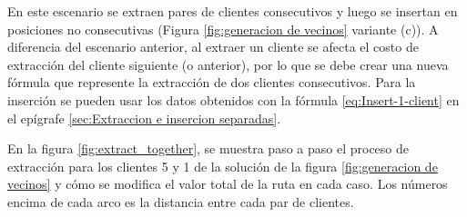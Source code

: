 \documentclass[12pt]{report}
\begin{document}
	En este escenario se extraen pares de clientes consecutivos y luego se insertan en posiciones no consecutivas (Figura \ref{fig:generacion de vecinos} variante (c)). A diferencia del escenario anterior, al extraer un cliente se afecta el costo de extracción del cliente siguiente (o anterior), por lo que se debe crear una nueva fórmula que represente la extracción de dos clientes consecutivos. Para la inserción se pueden usar los datos obtenidos con la fórmula \ref{eq:Insert-1-client} en el epígrafe \ref{sec:Extraccion e insercion separadas}.

	En la figura \ref{fig:extract_together}, se muestra paso a paso el proceso de extracción para los clientes 5 y 1 de la solución de la figura \ref{fig:generacion de vecinos} y cómo se modifica el valor total de la ruta en cada caso. Los números encima de cada arco es la distancia entre cada par de clientes.
\end{document}
